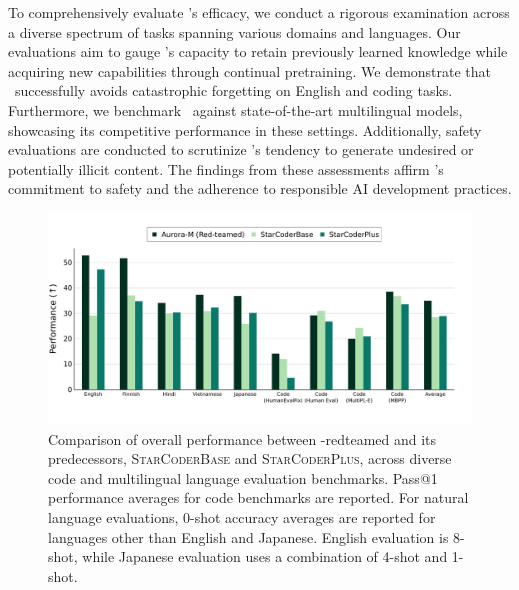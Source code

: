 
To comprehensively evaluate \system's efficacy, we conduct a rigorous examination across a diverse spectrum of tasks spanning various domains and languages. Our evaluations aim to gauge \system's capacity to retain previously learned knowledge while acquiring new capabilities through continual pretraining. We demonstrate that \system\ successfully avoids catastrophic forgetting on English and coding tasks. Furthermore, we benchmark \system\ against state-of-the-art multilingual models, showcasing its competitive performance in these settings. Additionally, safety evaluations are conducted to scrutinize \system's tendency to generate undesired or potentially illicit content. The findings from these assessments affirm \system's commitment to safety and the adherence to responsible AI development practices.


\begin{figure}[t]
\begin{center}
\includegraphics[width=\textwidth]{fig/plot.pdf}
\end{center}
\vspace{-8mm}
\caption{Comparison of overall performance between \textcolor{violet}{\system}-redteamed and its predecessors, \textsc{StarCoderBase} and \textsc{StarCoderPlus}, across diverse code and multilingual language evaluation benchmarks. Pass@1 performance averages for code benchmarks are reported. For natural language evaluations, 0-shot accuracy averages are reported for languages other than English and Japanese. English evaluation is 8-shot, while Japanese evaluation uses a combination of 4-shot and 1-shot.}
\vspace{-4.2mm}
\label{fig:overall}
\end{figure} 

